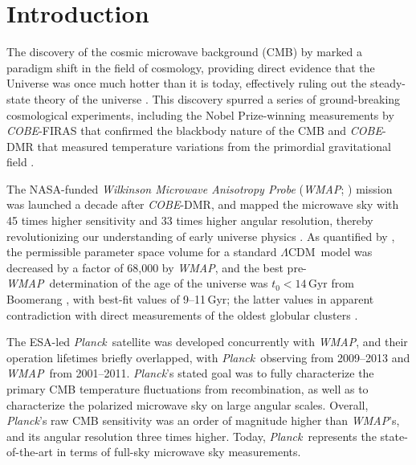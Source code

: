 \documentclass[twocolumn]{../../common/aa}
\def\WMAP{\emph{WMAP}}
\def\COBE{\emph{COBE}}
\def\Planck{\emph{Planck}}
\def\LCDM{$\Lambda$CDM}
\begin{document}
\maketitle

\tableofcontents



\section{Introduction}
\label{sec:introduction}

The discovery of the cosmic microwave background (CMB) by \citet{penzias:1965} marked a paradigm shift in the field of cosmology, providing direct evidence that the Universe was once much hotter than it is today, effectively ruling out the steady-state theory of the universe \citep{dicke:1965}. This discovery spurred a series of ground-breaking cosmological experiments, including the Nobel Prize-winning measurements by \COBE-FIRAS that confirmed the blackbody nature of the CMB \citep{mather:1994} and \COBE-DMR that measured temperature variations from the primordial gravitational field \citep{smoot:1992}.

The NASA-funded \textit{Wilkinson Microwave Anisotropy Probe} (\WMAP; \citealp{bennett2003:MAP}) mission was launched a decade after \COBE-DMR, and mapped the microwave sky with 45 times higher sensitivity and 33 times higher angular resolution, thereby revolutionizing our understanding of early universe physics \citep{bennett2003:MAP}. As quantified by \citet{bennett2012}, the permissible parameter space volume for a standard \LCDM\ model was decreased by a factor of 68,000 by \WMAP, and the best pre-\WMAP\ determination of the age of the universe was $t_0<14\,\mathrm{Gyr}$ from Boomerang \citep{lange:2001}, with best-fit values of 9--11\,Gyr; the latter values in apparent contradiction with direct measurements of the oldest globular clusters \citep{hu:2001}.

The ESA-led \Planck\ satellite \citep{planck2016-l01} was developed concurrently with \WMAP, and their operation lifetimes briefly overlapped, with \Planck\ observing from 2009--2013 and \WMAP\ from 2001--2011. \Planck's stated goal was to fully characterize the primary CMB temperature fluctuations from recombination, as well as to characterize the polarized microwave sky on large angular scales.  Overall, \Planck's raw CMB sensitivity was an order of magnitude higher than \WMAP's, and its angular resolution three times higher. Today, \Planck\ represents the state-of-the-art in terms of full-sky microwave sky measurements.
\end{document}

